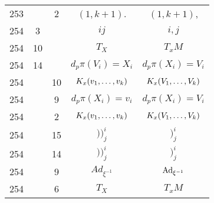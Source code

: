 \documentclass[a4paper,11pt]{article}
\begin{document}
\begin{center}
\begin{tabular}{|c|c|c|c|c|}
    253 & &  2 & $( 1, k + 1 )$. & $( 1, k + 1 )$, \\
    254 &  3 & & $ij$ & $i, j$ \\
    254 & 10 & & $T_{ X }$ & $T_{ x }M$ \\
    254 & 14 & & $d_{ p }\pi( V_{ i } ) = X_{ i }$
           & $d_{ p }\pi( X_{ i } ) = V_{ i }$ \\
    254 & & 10 & $K_{ x }( v_{ 1 }, \ldots, v_{ k } )$
           & $K_{ x }( V_{ 1 }, \ldots, V_{ k } )$ \\
    254 & &  9 & $d_{ p }\pi( X_{ i } ) = v_{ i }$
           & $d_{ p }\pi( X_{ i } ) = V_{ i }$ \\
    254 & &  2 & $K_{ x }( v_{ 1 }, \ldots, v_{ k } )$
           & $K_{ x }( V_{ 1 }, \ldots, V_{ k } )$ \\
    254 & & 15 & $) )^{ i }_{ j }$ & $)^{ i }_{ j }$ \\
    254 & & 14 & $) )^{ i }_{ j }$ & $)^{ i }_{ j }$ \\
    254 & &  9 & $Ad_{ \xi^{ -1 } }$ & $\mathrm{Ad}_{ \xi^{ -1 } }$ \\
    254 & &  6 & $T_{ X }$ & $T_{ x }M$ \\
    \hline
  \end{tabular}


\end{center}
\end{document}
